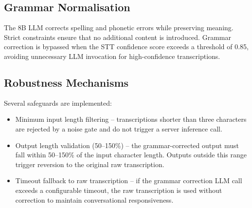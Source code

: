 \begin{table}[h]
\captionsetup{justification=raggedright,singlelinecheck=false,margin=0pt,indention=0pt}
\caption{STT Backend Comparison for Edge Audio Coordination Subsystem}
\label{tab:stt_comparison}
\noindent
{}
\end{table}
\noindent


\subsection{Grammar Normalisation}

The 8B LLM corrects spelling and phonetic errors while preserving meaning. Strict constraints ensure that no additional content is introduced. Grammar correction is bypassed when the STT confidence score exceeds a threshold of 0.85, avoiding unnecessary LLM invocation for high-confidence transcriptions.

\subsection{Robustness Mechanisms}

Several safeguards are implemented:

\begin{itemize}
    \item Minimum input length filtering -- transcriptions shorter than three characters are rejected by a noise gate and do not trigger a server inference call.

    \item Output length validation (50--150\%) -- the grammar-corrected output must fall within 50--150\% of the input character length. Outputs outside this range trigger reversion to the original raw transcription.

    \item Timeout fallback to raw transcription -- if the grammar correction LLM call exceeds a configurable timeout, the raw transcription is used without correction to maintain conversational responsiveness.
\end{itemize}

